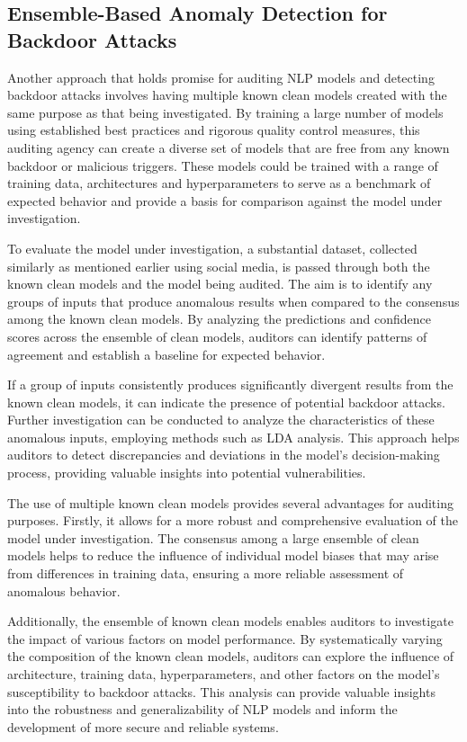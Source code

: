 \subsection{Ensemble-Based Anomaly Detection for Backdoor Attacks}

Another approach that holds promise for auditing NLP models and detecting backdoor attacks involves having multiple known clean models created with the same purpose as that being investigated. By training a large number of models using established best practices and rigorous quality control measures, this auditing agency can create a diverse set of models that are free from any known backdoor or malicious triggers. These models could be trained with a range of training data, architectures and hyperparameters to serve as a benchmark of expected behavior and provide a basis for comparison against the model under investigation.

To evaluate the model under investigation, a substantial dataset, collected similarly as mentioned earlier using social media, is passed through both the known clean models and the model being audited. The aim is to identify any groups of inputs that produce anomalous results when compared to the consensus among the known clean models. By analyzing the predictions and confidence scores across the ensemble of clean models, auditors can identify patterns of agreement and establish a baseline for expected behavior.

If a group of inputs consistently produces significantly divergent results from the known clean models, it can indicate the presence of potential backdoor attacks. Further investigation can be conducted to analyze the characteristics of these anomalous inputs, employing methods such as LDA analysis. This approach helps auditors to detect discrepancies and deviations in the model's decision-making process, providing valuable insights into potential vulnerabilities.

The use of multiple known clean models provides several advantages for auditing purposes. Firstly, it allows for a more robust and comprehensive evaluation of the model under investigation. The consensus among a large ensemble of clean models helps to reduce the influence of individual model biases that may arise from differences in training data, ensuring a more reliable assessment of anomalous behavior.

Additionally, the ensemble of known clean models enables auditors to investigate the impact of various factors on model performance. By systematically varying the composition of the known clean models, auditors can explore the influence of architecture, training data, hyperparameters, and other factors on the model's susceptibility to backdoor attacks. This analysis can provide valuable insights into the robustness and generalizability of NLP models and inform the development of more secure and reliable systems.

